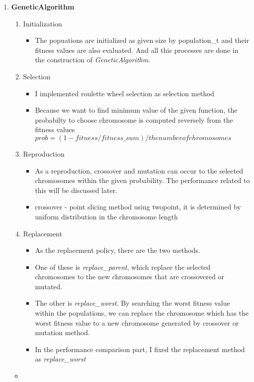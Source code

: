\documentclass{standalone}
\begin{document}
\begin{enumerate}
    \newpage %
    \item \textbf{GeneticAlgorithm}
    \begin{enumerate}
      \item Initialization
      \begin{itemize}
        \item The popuations are initialized as given size by population\_t and their fitness values are also evaluated. And all this processes are done in the construction of \emph{GeneticAlgorithm}.
      \end{itemize}
      \item Selection
      \begin{itemize}
        \item I implemented roulette wheel selection as selection method
        \item Because we want to find minimum value of the given function, the probabilty to choose chromosome is computed reversely from the fitness values \\
        $ prob = (1 - fitness/fitness\_sum)/the number of chromosomes $
      \end{itemize}
      \item Reproduction
      \begin{itemize}
        \item As a reproduction, crossover and mutation can occur to the selected chromosomes within the given probability. The performance related to this will be discussed later.
        \item crossover - point slicing method using twopoint, it is determined by uniform distribution in the chromosome length
      \end{itemize}
      \item Replacement
      \begin{itemize}
        \item As the replacement policy, there are the two methods. 
        \item One of these is \emph{replace\_parent}, which replace the selected chromosomes to the new chromosomes that are crossovered or mutated.
        \item The other is \emph{replace\_worst}. By searching the worst fitness value within the populations, we can replace the chromosome which has the worst fitness value to a new chromosome generated by crossover or mutation method.
        \item In the performance comparison part, I fixed the replacement method as \emph{replace\_worst}
      \end{itemize}
    \end{enumerate}

    \begin{itemize}[label=\quad,leftmargin=-5em]
      \item {}
    \end{itemize}

  \end{enumerate}
\end{document}
